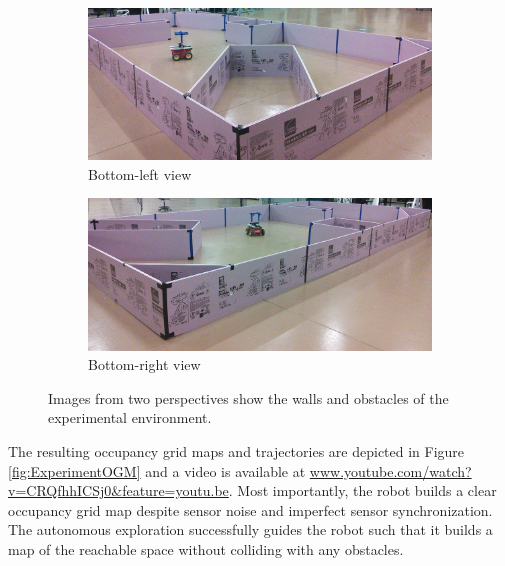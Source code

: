\documentclass[smallextended]{svjour3}       %
\newcommand{\WriteBlue}[1]{{\color{blue}\protect #1}}
\begin{document}
\begin{figure}
	\centering
    	\begin{subfigure}[b]{0.35\textwidth}
        		\includegraphics[width=\textwidth]{test_setup_bottom_left_cropped.jpg}
        		\caption{Bottom-left view}
        		\label{fig:Experiment_blv}
    	\end{subfigure}
	\hspace*{0.05\columnwidth}
	\begin{subfigure}[b]{0.35\textwidth}
        		\includegraphics[width=\textwidth]{test_setup_bottom_right_cropped.jpg}
        		\caption{Bottom-right view}
        		\label{fig:Experiment_brv}
    	\end{subfigure}
\caption{Images from two perspectives show the walls and obstacles of the experimental environment.}
\label{fig:ExpSetupPhoto}
\end{figure}


The resulting occupancy grid maps and trajectories are depicted in Figure \ref{fig:ExperimentOGM} and a video is available at \href{https://www.youtube.com/watch?v=CRQfhhICSj0&feature=youtu.be}{\WriteBlue{www.youtube.com/watch?v=CRQfhhICSj0\&feature=youtu.be}}. Most importantly, the robot builds a clear occupancy grid map despite sensor noise and imperfect sensor synchronization. The autonomous exploration successfully guides the robot such that it builds a map of the reachable space without colliding with any obstacles.
\end{document}
